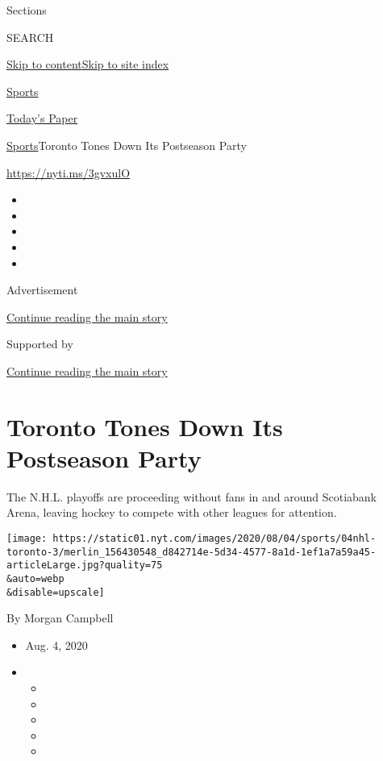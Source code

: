 Sections

SEARCH

\protect\hyperlink{site-content}{Skip to
content}\protect\hyperlink{site-index}{Skip to site index}

\href{https://www.nytimes.com/section/sports}{Sports}

\href{https://myaccount.nytimes.com/auth/login?response_type=cookie\&client_id=vi}{}

\href{https://www.nytimes.com/section/todayspaper}{Today's Paper}

\href{/section/sports}{Sports}\textbar{}Toronto Tones Down Its
Postseason Party

\url{https://nyti.ms/3gvxulO}

\begin{itemize}
\item
\item
\item
\item
\item
\end{itemize}

Advertisement

\protect\hyperlink{after-top}{Continue reading the main story}

Supported by

\protect\hyperlink{after-sponsor}{Continue reading the main story}

\hypertarget{toronto-tones-down-its-postseason-party}{%
\section{Toronto Tones Down Its Postseason
Party}\label{toronto-tones-down-its-postseason-party}}

The N.H.L. playoffs are proceeding without fans in and around Scotiabank
Arena, leaving hockey to compete with other leagues for attention.

\texttt{[image: https://static01.nyt.com/images/2020/08/04/sports/04nhl-toronto-3/merlin\_156430548\_d842714e-5d34-4577-8a1d-1ef1a7a59a45-articleLarge.jpg?quality=75\\\&auto=webp\\\&disable=upscale]}

By Morgan Campbell

\begin{itemize}
\item
  Aug. 4, 2020
\item
  \begin{itemize}
  \item
  \item
  \item
  \item
  \item
  \end{itemize}
\end{itemize}

